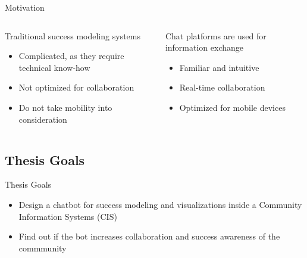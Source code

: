 \begin{frame}{Motivation}
  \begin{columns}
    \begin{column}[]{0.5\textwidth}

      Traditional success modeling systems
      \begin{itemize}
        \item Complicated, as they require technical know-how
        \item Not optimized for collaboration
        \item Do not take mobility into consideration
      \end{itemize}

    \end{column}
    \begin{column}[]{0.5\textwidth}
      Chat platforms are used for information exchange
      \begin{itemize}
        \item Familiar and intuitive
        \item Real-time collaboration
        \item Optimized for mobile devices
      \end{itemize}
    \end{column}
  \end{columns}

\end{frame}


\subsection{Thesis Goals}

\begin{frame}{Thesis Goals}
  \begin{itemize}
    \item Design a chatbot for success modeling and visualizations
          inside a Community Information Systems (CIS)
    \item Find out if the bot increases collaboration and success awareness of the commmunity %
  \end{itemize}
\end{frame}


